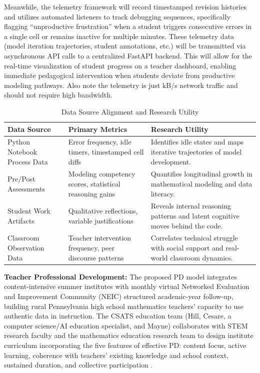 \documentclass[11pt]{article}
\begin{document}
Meanwhile, the telemetry framework will record timestamped revision histories and utilizes automated listeners to track debugging sequences, specifically flagging ``unproductive frustration'' when a student triggers consecutive errors in a single cell or remains inactive for multiple minutes.
These telemetry data (model iteration trajectories, student annotations, etc.) will be transmitted via asynchronous API calls to a centralized FastAPI backend.
This will allow for the real-time visualization of student progress on a teacher dashboard, enabling immediate pedagogical intervention when students deviate from productive modeling pathways.
Also note the telemetry is just kB/s network traffic and should not require high bandwidth.

\begin{table}[h]
\footnotesize
\centering
\caption{Data Source Alignment and Research Utility}
\label{tab:data_mapping}
\begin{tabular}{|p{3.5cm}|p{5cm}|p{6.5cm}|}
\hline
\rowcolor{mycmykcolor} 
\textbf{Data Source} & \textbf{Primary Metrics} & \textbf{Research Utility} \\ \hline

Python Notebook Process Data & Error frequency, idle timers, timestamped cell diffs & Identifies idle states and maps iterative trajectories of model development. \\ \hline

Pre/Post Assessments & Modeling competency scores, statistical reasoning gains & Quantifies longitudinal growth in mathematical modeling and data literacy. \\ \hline

Student Work Artifacts & Qualitative reflections, variable justifications & Reveals internal reasoning patterns and latent cognitive moves behind the code. \\ \hline

Classroom Observation Data & Teacher intervention frequency, peer discourse patterns & Correlates technical struggle with social support and real-world classroom dynamics. \\ \hline

\end{tabular}
\end{table}

\textbf{Teacher Professional Development:} 
The proposed PD model integrates content-intensive summer institutes with monthly virtual Networked Evaluation and Improvement Community (NEIC) structured academic-year follow-up, building rural Pennsylvania high school mathematics teachers' capacity to use authentic data in instruction.
The CSATS education team (Hill, Cesare, a computer science/AI education specialist, and Mayne) collaborates with STEM research faculty and the mathematics education research team to design institute curriculum incorporating the five features of effective PD: content focus, active learning, coherence with teachers' existing knowledge and school context, sustained duration, and collective participation \cite{DarlingHammond2017}.
\end{document}
